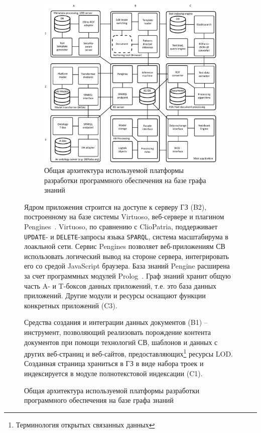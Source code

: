 \documentclass[ 

]{aiitart}
\begin{document}
\begin{figure} \centering

\begin{figure}
\centering
\includegraphics[width=1\linewidth]{architecture-mda-lod-ext-general.pdf}
\caption{Общая архитектура используемой платформы разработки программного обеспечения на базе графа знаний}
\label{fig:arch}
\end{figure}

Ядром приложения строится на доступе к серверу ГЗ (B2), построенному на базе системы Virtuoso, веб-сервере и плагином Pengines~\cite{pengines}. Virtuoso, по сравнению с ClioPatria, поддерживает \verb|UPDATE|- и \verb|DELETE|-запросы языка \verb|SPARQL|, система масштабирума в лоакльной сети. Сервис Pengines позволяет веб-приложениям СВ использовать логический вывод на стороне сервера, интегрировать его со средой JavaScript браузера. База знаний Pengine расширена за счет программных модулей Prolog~\cite{b10,swi}. Граф знаний хранит общую часть A- и T-боксов данных приложений, т.е. это база данных приложений. Другие модули и ресурсы оснащают функции конкретных приложений (C3). 

Средства создания и интеграции данных документов (B1) -- инструмент, позволяющий реализовать порождение контента документов при помощи технологий СВ, шаблонов и данных с других веб-страниц и веб-сайтов, предоставляющих\footnote{Терминология открытых связанных данных} \cite{b1,c6} ресурсы LOD. Созданная страница храниться в ГЗ в виде набора троек и индексируется в модуле полнотекстовой индексации (C1). 


\end{figure}
\end{document}
